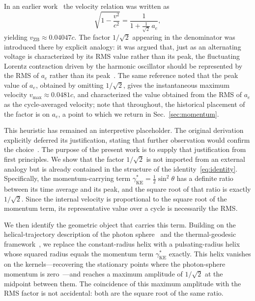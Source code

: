 \documentclass[%
 reprint, amsmath,amssymb, aps, prb, ]{revtex4-2}
\numberwithin{equation}{section}
\newcommand{\vZB}{v_{\text{ZB}}}
\newcommand{\gKE}{\gamma^{*}_{\text{KE}}}
\begin{document}
In an earlier work~\cite{hanamura10} the velocity relation was written as
\begin{equation}
\sqrt{1-\frac{v^2}{c^2}} = \frac{1}{1+\frac{1}{\sqrt{2}}\,a_e},
\label{eq:bridge}
\end{equation}
yielding $\vZB \approx 0.04047c$. The factor $1/\sqrt{2}$ appearing in the denominator was introduced there by explicit analogy: it was argued that, just as an alternating voltage is characterized by its RMS value rather than its peak, the fluctuating Lorentz contraction driven by the harmonic oscillator should be represented by the RMS of $a_e$ rather than its peak~\cite{hanamura10}. The same reference noted that the peak value of $a_e$, obtained by omitting $1/\sqrt{2}$, gives the instantaneous maximum velocity $v_{\max}\approx 0.0481c$, and characterized the value obtained from the RMS of $a_e$ as the cycle-averaged velocity; note that throughout, the historical placement of the factor is on $a_e$, a point to which we return in Sec.~\ref{sec:momentum}.

This heuristic has remained an interpretive placeholder. The original derivation explicitly deferred its justification, stating that further observation would confirm the choice~\cite{hanamura10}. The purpose of the present work is to supply that justification from first principles. We show that the factor $1/\sqrt{2}$ is not imported from an external analogy but is already contained in the structure of the identity~\eqref{eq:identity}. Specifically, the momentum-carrying term $\gKE=\tfrac{1}{2}\sin^2\theta$ has a definite ratio between its time average and its peak, and the square root of that ratio is exactly $1/\sqrt{2}$. Since the internal velocity is proportional to the square root of the momentum term, its representative value over a cycle is necessarily the RMS.

We then identify the geometric object that carries this term. Building on the helical-trajectory description of the photon sphere~\cite{hanamura51} and the thermal-geodesic framework~\cite{hanamura24}, we replace the constant-radius helix with a pulsating-radius helix whose squared radius equals the momentum term $\gKE$ exactly. This helix vanishes on the kernels---recovering the stationary points where the photon-sphere momentum is zero~\cite{hanamura07}---and reaches a maximum amplitude of $1/\sqrt{2}$ at the midpoint between them. The coincidence of this maximum amplitude with the RMS factor is not accidental: both are the square root of the same ratio.
\end{document}
